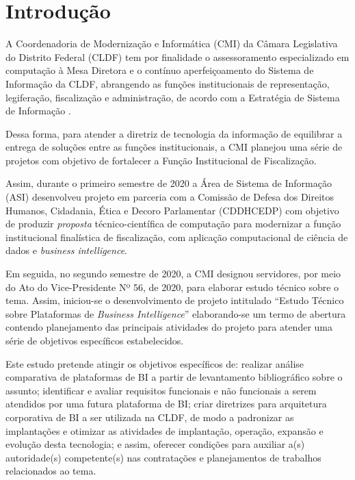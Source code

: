 \chapter{Introdução}
\label{cap-intro}

    A Coordenadoria de Modernização e Informática (CMI) da Câmara Legislativa do Distrito Federal (CLDF) tem por finalidade o assessoramento especializado em computação à Mesa Diretora e o contínuo aperfeiçoamento do Sistema de Informação da CLDF, abrangendo as funções institucionais de representação, legiferação, fiscalização e administração, de acordo com a Estratégia de Sistema de Informação \cite{normativo:res312,asiESI}.
    
    Dessa forma, para atender a diretriz de tecnologia da informação de equilibrar a entrega de soluções entre as funções institucionais, a CMI planejou uma série de projetos com objetivo de fortalecer a Função Institucional de Fiscalização.
    
    Assim, durante o primeiro semestre de 2020 a Área de Sistema de Informação (ASI) desenvolveu projeto em parceria com a Comissão de Defesa dos Direitos Humanos, Cidadania, Ética e Decoro Parlamentar (CDDHCEDP) com objetivo de produzir \emph{proposta} técnico-científica de computação para modernizar a função institucional finalística de fiscalização, com aplicação computacional de ciência de dados e \emph{business intelligence}. 

    Em seguida, no segundo semestre de 2020, a CMI designou servidores, por meio do Ato do Vice-Presidente Nº 56, de 2020, para elaborar estudo técnico sobre o tema. Assim, iniciou-se  o desenvolvimento de projeto intitulado ``Estudo Técnico sobre Plataformas de \emph{Business Intelligence}'' elaborando-se um termo de abertura contendo planejamento das principais atividades do projeto para atender uma série de objetivos específicos estabelecidos.
    
    Este estudo pretende atingir os objetivos específicos de: realizar análise comparativa de plataformas de BI a partir de levantamento bibliográfico sobre o assunto; identificar e avaliar requisitos funcionais e não funcionais a serem atendidos por uma futura plataforma de BI; criar diretrizes para arquitetura corporativa de BI a ser utilizada na CLDF, de modo a padronizar as implantações e otimizar as atividades de implantação, operação, expansão e evolução desta tecnologia; e assim, oferecer condições para auxiliar a(s) autoridade(s) competente(s) nas contratações e planejamentos de trabalhos relacionados ao tema. 